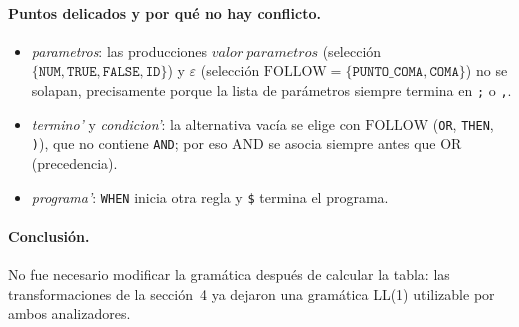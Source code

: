 \paragraph{Puntos delicados y por qué no hay conflicto.}
\begin{itemize}[nosep]
\item \textit{parametros}: las producciones $\textit{valor}\ \textit{parametros}$ (selección $\{\texttt{NUM},\texttt{TRUE},\texttt{FALSE},\texttt{ID}\}$) y $\varepsilon$ (selección
$\mathrm{FOLLOW}=\{\texttt{PUNTO\_COMA},\texttt{COMA}\}$) no se solapan, precisamente porque la lista de parámetros siempre termina en
\texttt{;} o \texttt{,}.
\item \textit{termino'} y \textit{condicion'}: la alternativa vacía se elige con $\mathrm{FOLLOW}$ (\texttt{OR}, \texttt{THEN}, \texttt{)}), que no
contiene \texttt{AND}; por eso AND se asocia siempre antes que OR (precedencia).
\item \textit{programa'}: \texttt{WHEN} inicia otra regla y \texttt{\$} termina el programa.
\end{itemize}
\paragraph{Conclusión.} No fue necesario modificar la gramática después de calcular la tabla: las transformaciones de la
sección~4 ya dejaron una gramática LL(1) utilizable por ambos analizadores.

